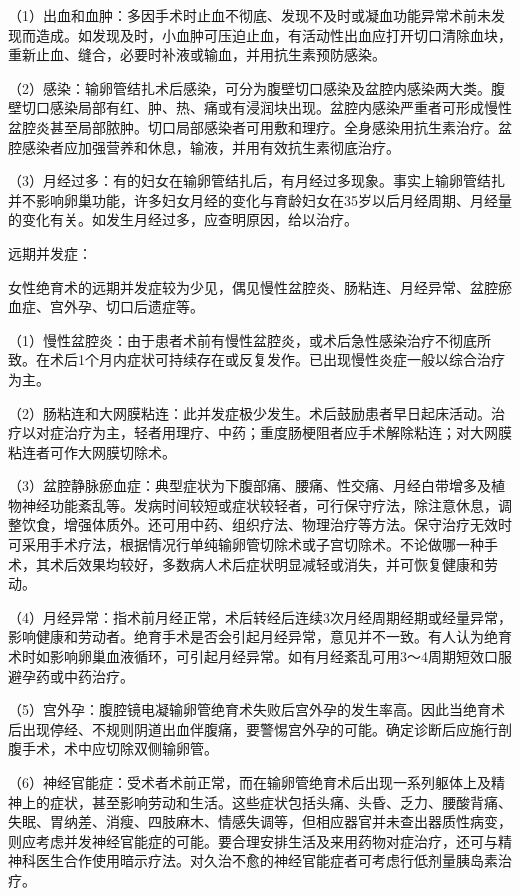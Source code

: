 \documentclass[12pt,UTF8,openany]{ctexbook}
\begin{document}
（1）出血和血肿：多因手术时止血不彻底、发现不及时或凝血功能异常术前未发现而造成。如发现及时，小血肿可压迫止血，有活动性出血应打开切口清除血块，重新止血、缝合，必要时补液或输血，并用抗生素预防感染。

（2）感染：输卵管结扎术后感染，可分为腹壁切口感染及盆腔内感染两大类。腹壁切口感染局部有红、肿、热、痛或有浸润块出现。盆腔内感染严重者可形成慢性盆腔炎甚至局部脓肿。切口局部感染者可用敷和理疗。全身感染用抗生素治疗。盆腔感染者应加强营养和休息，输液，并用有效抗生素彻底治疗。

（3）月经过多：有的妇女在输卵管结扎后，有月经过多现象。事实上输卵管结扎并不影响卵巢功能，许多妇女月经的变化与育龄妇女在35岁以后月经周期、月经量的变化有关。如发生月经过多，应查明原因，给以治疗。

远期并发症：

女性绝育术的远期并发症较为少见，偶见慢性盆腔炎、肠粘连、月经异常、盆腔瘀血症、宫外孕、切口后遗症等。

（1）慢性盆腔炎：由于患者术前有慢性盆腔炎，或术后急性感染治疗不彻底所致。在术后1个月内症状可持续存在或反复发作。已出现慢性炎症一般以综合治疗为主。

（2）肠粘连和大网膜粘连：此并发症极少发生。术后鼓励患者早日起床活动。治疗以对症治疗为主，轻者用理疗、中药；重度肠梗阻者应手术解除粘连；对大网膜粘连者可作大网膜切除术。

（3）盆腔静脉瘀血症：典型症状为下腹部痛、腰痛、性交痛、月经白带增多及植物神经功能紊乱等。发病时间较短或症状较轻者，可行保守疗法，除注意休息，调整饮食，增强体质外。还可用中药、组织疗法、物理治疗等方法。保守治疗无效时可采用手术疗法，根据情况行单纯输卵管切除术或子宫切除术。不论做哪一种手术，其术后效果均较好，多数病人术后症状明显减轻或消失，并可恢复健康和劳动。

（4）月经异常：指术前月经正常，术后转经后连续3次月经周期经期或经量异常，影响健康和劳动者。绝育手术是否会引起月经异常，意见并不一致。有人认为绝育术时如影响卵巢血液循环，可引起月经异常。如有月经紊乱可用3～4周期短效口服避孕药或中药治疗。

（5）宫外孕：腹腔镜电凝输卵管绝育术失败后宫外孕的发生率高。因此当绝育术后出现停经、不规则阴道出血伴腹痛，要警惕宫外孕的可能。确定诊断后应施行剖腹手术，术中应切除双侧输卵管。

（6）神经官能症：受术者术前正常，而在输卵管绝育术后出现一系列躯体上及精神上的症状，甚至影响劳动和生活。这些症状包括头痛、头昏、乏力、腰酸背痛、失眠、胃纳差、消瘦、四肢麻木、情感失调等，但相应器官并未查出器质性病变，则应考虑并发神经官能症的可能。要合理安排生活及来用药物对症治疗，还可与精神科医生合作使用暗示疗法。对久治不愈的神经官能症者可考虑行低剂量胰岛素治疗。
\end{document}
